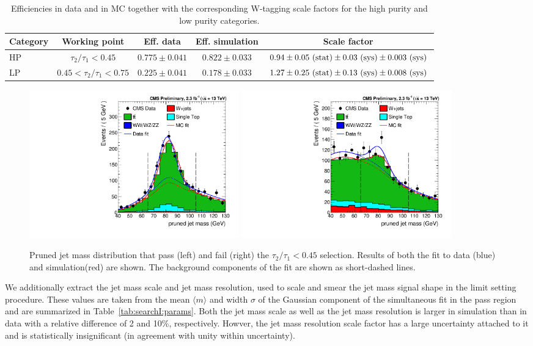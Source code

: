 \begin{table}[h!]
   \centering
   \footnotesize
   \begin{tabular}{| l | c | c | c | c |}
   \hline
   Category & Working point & Eff. data & Eff. simulation & Scale factor\\
   \hline
   HP&$\tau_2 / \tau_1 < 0.45$& $0.775 \pm 0.041 $& $0.822 \pm 0.033$ &$0.94 \pm 0.05~\rm{(stat)} \pm 0.03~\rm{(sys)} \pm 0.003~\rm{(sys)}$\\
   LP&$0.45 < \tau_2 / \tau_1 < 0.75$& $0.225 \pm 0.041 $& $0.178 \pm 0.033$ &$1.27 \pm 0.25~\rm{(stat)} \pm 0.13~\rm{(sys)} \pm 0.008~\rm{(sys)}$\\
   \hline
   \end{tabular}
   \caption{Efficiencies in data and in MC together with the corresponding W-tagging scale factors for the high purity and low purity categories. }
   \label{tab:searchI:WtagSFs}
\end{table}


\begin{figure}[htbp]
\centering
\includegraphics[width=0.44\textwidth]{figures/vtagging/AN-16-215/_HP0v45powheg_76X_em_pTbin_200_5000.pdf}
\includegraphics[width=0.44\textwidth]{figures/vtagging/AN-16-215/_HP0v45powheg_76X_em_fail_pTbin_200_5000.pdf} \\
\caption{Pruned jet mass distribution that pass (left) and fail (right) the $\tau_2 / \tau_1 < 0.45$ selection. Results of both the fit to data (blue) and simulation(red) are shown. The background components of the fit are shown as short-dashed lines.}
\label{fig:searchII:simfit}
\end{figure}

We additionally extract the jet mass scale and jet mass resolution, used to scale and smear the jet mass signal shape in the limit setting procedure. These values are taken from the mean $\langle m \rangle$ and width $\sigma$ of the Gaussian
component of the simultaneous fit in the pass region and are summarized in Table~\ref{tab:searchI:params}. Both the jet mass scale as well as the jet mass resolution is larger in simulation than in data with a relative difference of 2 and 10\%, respectively.
Howver, the jet mass resolution scale factor has a large uncertainty attached to it and is statistically insignificant (in agreement with unity within uncertainty).

